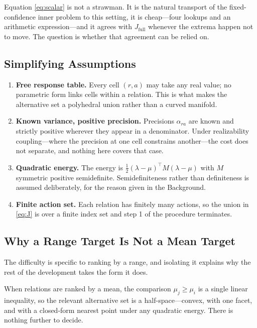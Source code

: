 Equation \eqref{eq:scalar} is not a strawman. It is the natural transport of the
fixed-confidence inner problem to this setting, it is cheap---four lookups and an arithmetic
expression---and it agrees with $J_{\mathrm{full}}$ whenever the extrema happen not to move.
The question is whether that agreement can be relied on.

\subsection{Simplifying Assumptions}

\begin{enumerate}
\item[1)] \textbf{Free response table.} Every cell $(r,a)$ may take any real value; no
parametric form links cells within a relation. This is what makes the alternative set a
polyhedral union rather than a curved manifold.

\item[2)] \textbf{Known variance, positive precision.} Precisions $\alpha_{ra}$ are known and
strictly positive wherever they appear in a denominator. Under realizability coupling---where
the precision at one cell constrains another---the cost does not separate, and nothing here
covers that case.

\item[3)] \textbf{Quadratic energy.} The energy is $\tfrac12(\lambda-\mu)^{\top}M(\lambda-\mu)$
with $M$ symmetric positive semidefinite. Semidefiniteness rather than definiteness is
assumed deliberately, for the reason given in the Background.

\item[4)] \textbf{Finite action set.} Each relation has finitely many actions, so the union in
\eqref{eq:J} is over a finite index set and step 1 of the procedure terminates.
\end{enumerate}

\subsection{Why a Range Target Is Not a Mean Target}

The difficulty is specific to ranking by a range, and isolating it explains why the rest of
the development takes the form it does.

When relations are ranked by a mean, the comparison $\mu_{j}\ge\mu_{i}$ is a single linear
inequality, so the relevant alternative set is a half-space---convex, with one facet, and
with a closed-form nearest point under any quadratic energy. There is nothing further to
decide.

